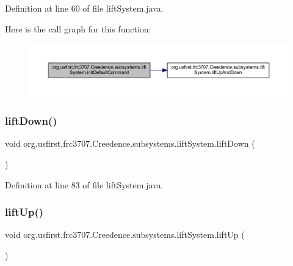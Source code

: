 Definition at line 60 of file lift\+System.\+java.

Here is the call graph for this function\+:
\nopagebreak
\begin{figure}[H]
\begin{center}
\leavevmode
\includegraphics[width=350pt]{classorg_1_1usfirst_1_1frc3707_1_1_creedence_1_1subsystems_1_1lift_system_aabf6aa218075c4dc8855437fb48bd5a9_cgraph}
\end{center}
\end{figure}
\mbox{\label{classorg_1_1usfirst_1_1frc3707_1_1_creedence_1_1subsystems_1_1lift_system_a88d53bbd332c0be694214aeaeee5e237}} 
\subsubsection{\texorpdfstring{liftDown()}{liftDown()}}
{\footnotesize\ttfamily void org.\+usfirst.\+frc3707.\+Creedence.\+subsystems.\+lift\+System.\+lift\+Down (\begin{DoxyParamCaption}{ }\end{DoxyParamCaption})}



Definition at line 83 of file lift\+System.\+java.

\mbox{\label{classorg_1_1usfirst_1_1frc3707_1_1_creedence_1_1subsystems_1_1lift_system_a3d85f01aeecfc160f8e9e85be4f82915}} 
\subsubsection{\texorpdfstring{liftUp()}{liftUp()}}
{\footnotesize\ttfamily void org.\+usfirst.\+frc3707.\+Creedence.\+subsystems.\+lift\+System.\+lift\+Up (\begin{DoxyParamCaption}{ }\end{DoxyParamCaption})}



